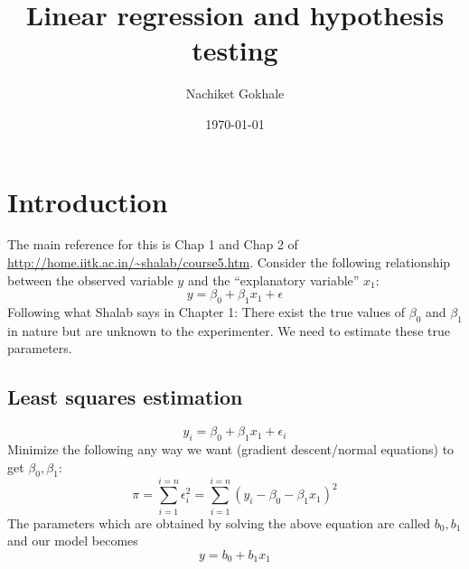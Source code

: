 \documentclass{article}
\newcommand{\beq}{\begin{equation}}
\newcommand{\eeq}{\end{equation}}
\begin{document}
\title{Linear regression and hypothesis testing}
\author{Nachiket Gokhale}
\date{\today}
\maketitle
\section{Introduction}
The main reference for this is Chap 1 and Chap 2 of \url{http://home.iitk.ac.in/~shalab/course5.htm}. Consider the following relationship between the observed variable $y$ and the ``explanatory variable'' $x_1$:
\beq
y = \beta_0 + \beta_1x_1 + \epsilon
\eeq
Following what Shalab says in Chapter 1: There exist the true values of $\beta_0$ and $\beta_1$ in nature but are unknown to the experimenter. We need to estimate these true parameters.
\subsection{Least squares estimation}
\beq
y_i = \beta_0 + \beta_1x_1 + \epsilon_i
\eeq
Minimize the following any way we want (gradient descent/normal equations) to get $\beta_0,\beta_1$:
\beq
\pi = \sum_{i=1}^{i=n}\epsilon_i^2 = \sum_{i=1}^{i=n}(y_i - \beta_0 - \beta_1x_1)^2
\eeq
The parameters which are obtained by solving the above equation are called $b_0,b_1$ and our model becomes
\beq
y = b_0 + b_1x_1
\eeq
\end{document}
